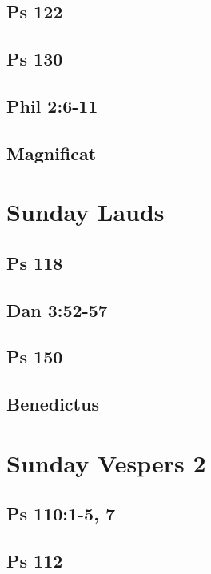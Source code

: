 \subsection{Ps 122}

\subsection{Ps 130}

\subsection{Phil 2:6-11}

\subsection{Magnificat}


\section{Sunday Lauds}

\subsection{Ps 118}

\subsection{Dan 3:52-57}

\subsection{Ps 150}

\subsection{Benedictus}


\section{Sunday Vespers 2}

\subsection{Ps 110:1-5, 7}

\subsection{Ps 112}

